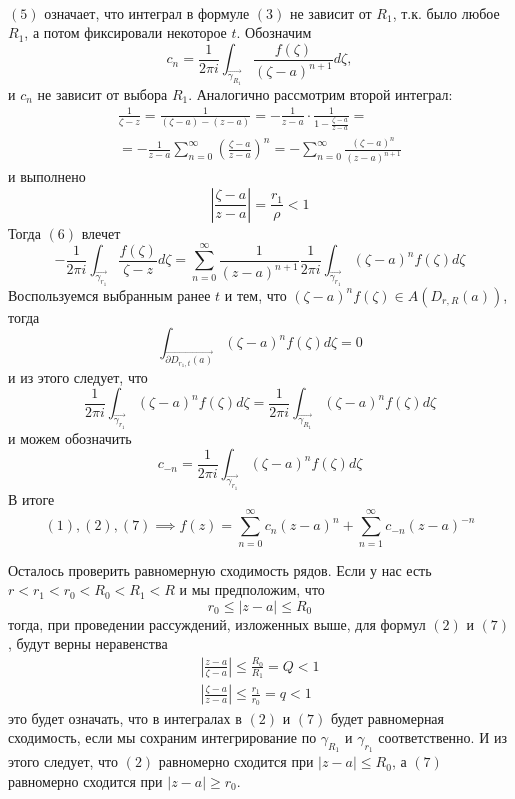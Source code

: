 \documentclass[main]{subfiles}
\begin{document}
\begin{longProof}
\begin{gather*}
    \end{gather*}
    $(5)$ означает, что интеграл в формуле $(3)$ не зависит от $R_1$, т.к. было любое $R_1$, а потом фиксировали некоторое $t$.
    Обозначим
    \[c_n = \frac{1}{2 \pi i}  \int_{\overrightarrow{\gamma_{R_1}}} \frac{f(\zeta)}{(\zeta -a)^{n+1}} d\zeta,\]
    и $c_n$ не зависит от выбора $R_1$.
    Аналогично рассмотрим второй интеграл:
    \begin{multline*}
        \frac{1}{\zeta - z} = \frac{1}{(\zeta - a) - (z - a)} = -\frac{1}{z - a}\cdot \frac{1}{1 - \frac{\zeta - a}{z - a}} = \\
        = -\frac{1}{z - a} \sum_{n = 0 }^{\infty} \left(\frac{\zeta - a}{z -a}\right)^n = - \sum_{n = 0 }^{\infty} \frac{(\zeta- a)^n}{(z -a)^{n+1}} \tag{6}
    \end{multline*}
    и выполнено
    \[\left| \frac{\zeta - a}{z - a} \right| = \frac{r_1}{\rho} < 1\]
    Тогда $(6)$ влечет
    \[- \frac{1}{2 \pi i } \int_{\overrightarrow{\gamma_{r_1}}} \frac{f(\zeta)}{\zeta - z} d\zeta  = \sum_{n = 0 }^{\infty} \frac{1}{(z-a)^{n+1}} \frac{1}{2 \pi i} \int_{\overrightarrow{\gamma_{r_1}}} (\zeta - a)^n f(\zeta) d\zeta \tag{7} \]
    Воспользуемся выбранным ранее $t$ и тем, что $(\zeta - a)^n f(\zeta) \in A(D_{r, R}(a))$, тогда
    \[\int_{\overrightarrow{\partial D_{r_1, t} (a)}}  (\zeta - a)^n f(\zeta) d\zeta = 0 \tag{8}\]
    и из этого следует, что
    \[\frac{1}{2 \pi i} \int_{\overrightarrow{\gamma_{r_1}}} (\zeta - a)^n f(\zeta) d\zeta =  \frac{1}{2 \pi i}  \int_{\overrightarrow{\gamma_{R_1}}} (\zeta - a)^n f(\zeta) d\zeta \tag{9}\]
    и можем обозначить
    \[c_{-n} = \frac{1}{2 \pi i} \int_{\overrightarrow{\gamma_{r_1}}} (\zeta - a)^n f(\zeta) d\zeta\]
    В итоге
    \[(1), (2), (7) \implies f(z) = \sum_{n=0}^{\infty} c_{n} (z-a)^n + \sum_{n=1}^{\infty} c_{-n} (z-a)^{-n}\]

    Осталось проверить равномерную сходимость рядов.
    Если у нас есть $r < r_1 < r_0 < R_0 < R_1 < R$ и мы предположим, что
    \[r_0 \le |z-a| \le R_0\]
    тогда, при проведении рассуждений, изложенных выше, для формул $(2)$ и $(7)$, будут верны неравенства
    \begin{gather*}
        \left| \frac{z-a}{\zeta - a} \right| \le \frac{R_0}{R_1} = Q < 1\\
        \left| \frac{\zeta - a}{z - a} \right| \le \frac{r_1}{r_0} = q < 1
    \end{gather*}
    это будет означать, что в интегралах в $(2)$ и $(7)$ будет равномерная сходимость, если мы сохраним интегрирование по $\gamma_{R_1}$ и $\gamma_{r_1}$ соответственно.
    И из этого следует, что $(2)$ равномерно сходится при $|z - a| \le R_0$, а $(7)$ равномерно сходится при $|z - a| \ge r_0$.
\end{longProof}
\end{document}
